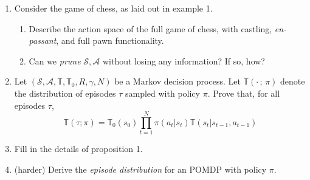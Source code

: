 \documentclass[12pt]{article}
\begin{document}
\begin{enumerate}
    \item Consider the game of chess, as laid out in example 1. 
    \begin{enumerate}
        \item Describe the action space of the full game of chess, with castling, \textit{en-passant}, and full pawn functionality. 
        \item Can we \textit{prune} $\mathcal{S}, \mathcal{A}$ without losing any information? If so, how? 
    \end{enumerate}
    \item Let $(\mathcal{S}, \mathcal{A}, \mathbb{T}, \mathbb{T}_0, R, \gamma, N)$ be a Markov decision process. Let 
    $\mathbb{T}(\cdot \, ; \, \pi)$ denote the distribution of episodes $\tau$ sampled with policy $\pi$. Prove that, for 
    all episodes $\tau$, 
    $$
    \mathbb{T}(\tau ; \pi) = \mathbb{T}_0(s_0)\prod_{t=1}^N \pi(a_t | s_t)\mathbb{T}(s_t | s_{t-1}, a_{t-1})
    $$ 
    \item Fill in the details of proposition 1.
    \item (harder) Derive the \textit{episode distribution} for an POMDP with policy $\pi$.
\end{enumerate}



\end{document}
